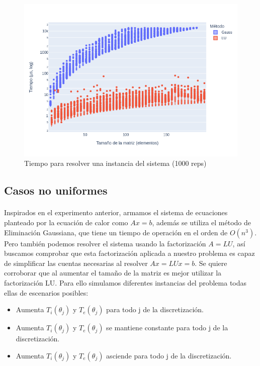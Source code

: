 \documentclass[12pt]{article}
\begin{document}
\begin{figure}[H]
\centering
\includegraphics[scale=0.5]{times.1.t_solve}
\caption{Tiempo para resolver una instancia del sistema (1000 reps)}
\label{fig:solve.time}
\end{figure}

\subsection{Casos no uniformes}
\paragraph{} Inspirados en el experimento anterior, armamos el sistema de ecuaciones planteado por la ecuación de calor como \(Ax = b\), además se utiliza el método de Eliminación Gaussiana, que tiene un tiempo de operación en el orden de $O({n^3})$. Pero también podemos resolver el sistema usando la factorización \(A = LU\), así buscamos comprobar que esta factorización aplicada a nuestro problema es capaz de simplificar las cuentas necesarias al resolver \(Ax = LUx = b\). Se quiere corroborar que al aumentar el tamaño de la matriz es mejor utilizar la factorización LU. Para ello simulamos diferentes instancias del problema todas ellas de escenarios posibles:
\begin{itemize}
	\item Aumenta $T_{i}(\theta_{j} )$ y $T_{e}(\theta_{j})$ para todo j de la discretización.
	\item Aumenta $T_{i}(\theta_{j} )$ y $T_{e}(\theta_{j})$ se mantiene constante para todo j de la discretización.
	\item Aumenta $T_{i}(\theta_{j} )$ y $T_{e}(\theta_{j})$ asciende para todo j de la discretización.
\end{itemize}
\end{document}
